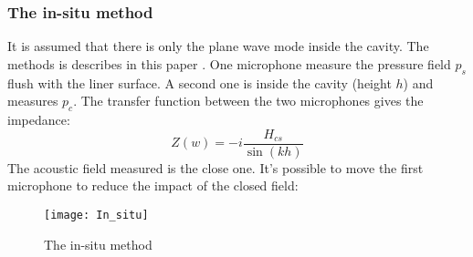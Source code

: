 \subsubsection{The in-situ method}
It is assumed that there is only the plane wave mode inside the cavity.
The methods is describes in this paper \cite{Boden_method}. One microphone measure the pressure field $p_s$ flush with the liner surface. A second one is inside the cavity (height $h$) and measures $p_c$. The transfer function between the two microphones gives the impedance:
\begin{equation}
    Z(w)=-i\frac{H_{cs}}{\sin(kh)}
\end{equation}
The acoustic field measured is the close one. It's possible to move the first microphone to reduce the impact of the closed field:
\begin{figure}[H] \centering
    \texttt{[image: In\_situ]}
    \caption{The in-situ method}
\end{figure}
